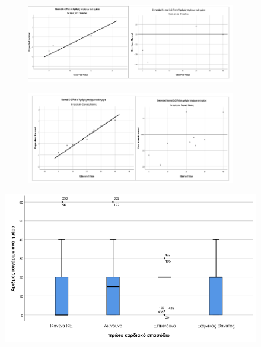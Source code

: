 \begin{figure}
 \centering

     \begin{subfigure}{0.8\textwidth}
     \centering
         \includegraphics[width=\textwidth]{images/302.PNG}
                      \end{subfigure}
                      
     \vspace{2cm}
     
     \begin{subfigure}{0.8\textwidth}
     \centering
         \includegraphics[width=\textwidth]{images/303.PNG}
             \end{subfigure}
\end{figure}

\clearpage

\begin{figure}[ht]
    \centering
    \includegraphics[width=\textwidth]{images/304.png}
\end{figure}

